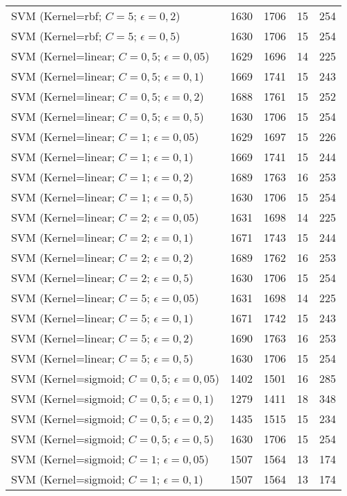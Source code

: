 \begin{center}
\begin{longtable}{|l|l|l|l|l|}
SVM (Kernel=rbf; $C=5$; $\epsilon=0,2$) & 1630 & 1706 & 15 & 254 \\
SVM (Kernel=rbf; $C=5$; $\epsilon=0,5$) & 1630 & 1706 & 15 & 254 \\
SVM (Kernel=linear; $C=0,5$; $\epsilon=0,05$) & 1629 & 1696 & 14 & 225 \\
SVM (Kernel=linear; $C=0,5$; $\epsilon=0,1$) & 1669 & 1741 & 15 & 243 \\
SVM (Kernel=linear; $C=0,5$; $\epsilon=0,2$) & 1688 & 1761 & 15 & 252 \\
SVM (Kernel=linear; $C=0,5$; $\epsilon=0,5$) & 1630 & 1706 & 15 & 254 \\
SVM (Kernel=linear; $C=1$; $\epsilon=0,05$) & 1629 & 1697 & 15 & 226 \\
SVM (Kernel=linear; $C=1$; $\epsilon=0,1$) & 1669 & 1741 & 15 & 244 \\
SVM (Kernel=linear; $C=1$; $\epsilon=0,2$) & 1689 & 1763 & 16 & 253 \\
SVM (Kernel=linear; $C=1$; $\epsilon=0,5$) & 1630 & 1706 & 15 & 254 \\
SVM (Kernel=linear; $C=2$; $\epsilon=0,05$) & 1631 & 1698 & 14 & 225 \\
SVM (Kernel=linear; $C=2$; $\epsilon=0,1$) & 1671 & 1743 & 15 & 244 \\
SVM (Kernel=linear; $C=2$; $\epsilon=0,2$) & 1689 & 1762 & 16 & 253 \\
SVM (Kernel=linear; $C=2$; $\epsilon=0,5$) & 1630 & 1706 & 15 & 254 \\
SVM (Kernel=linear; $C=5$; $\epsilon=0,05$) & 1631 & 1698 & 14 & 225 \\
SVM (Kernel=linear; $C=5$; $\epsilon=0,1$) & 1671 & 1742 & 15 & 243 \\
SVM (Kernel=linear; $C=5$; $\epsilon=0,2$) & 1690 & 1763 & 16 & 253 \\
SVM (Kernel=linear; $C=5$; $\epsilon=0,5$) & 1630 & 1706 & 15 & 254 \\
SVM (Kernel=sigmoid; $C=0,5$; $\epsilon=0,05$) & 1402 & 1501 & 16 & 285 \\
SVM (Kernel=sigmoid; $C=0,5$; $\epsilon=0,1$) & 1279 & 1411 & 18 & 348 \\
SVM (Kernel=sigmoid; $C=0,5$; $\epsilon=0,2$) & 1435 & 1515 & 15 & 234 \\
SVM (Kernel=sigmoid; $C=0,5$; $\epsilon=0,5$) & 1630 & 1706 & 15 & 254 \\
SVM (Kernel=sigmoid; $C=1$; $\epsilon=0,05$) & 1507 & 1564 & 13 & 174 \\
SVM (Kernel=sigmoid; $C=1$; $\epsilon=0,1$) & 1507 & 1564 & 13 & 174 \\

\end{longtable}
\end{center}
